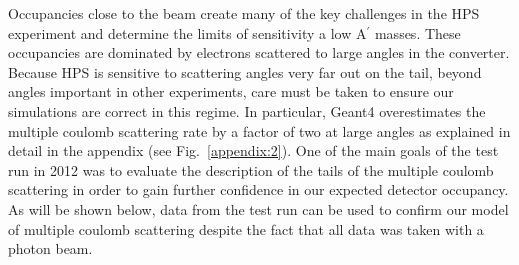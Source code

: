 Occupancies close to the beam create many of the key challenges in the HPS experiment
and determine the limits of sensitivity a low A$^\prime$ masses.
These occupancies are dominated by electrons scattered to large angles 
in the converter. Because HPS is sensitive to scattering angles very far out 
on the tail, beyond angles important in other experiments, care must be taken
to ensure our simulations are correct in this regime.  In particular,
Geant4 overestimates the multiple coulomb scattering rate by a factor of two  
at large angles as explained in detail in the appendix (see Fig.~\ref{appendix:2}).
One of the main goals of the test run in 2012 was to evaluate the description of the tails of the multiple coulomb scattering in order 
to gain further confidence in our expected detector occupancy. As will be shown below, data from the 
test run can be used to confirm our model of multiple coulomb scattering despite the fact that 
all data was taken with a photon beam.

